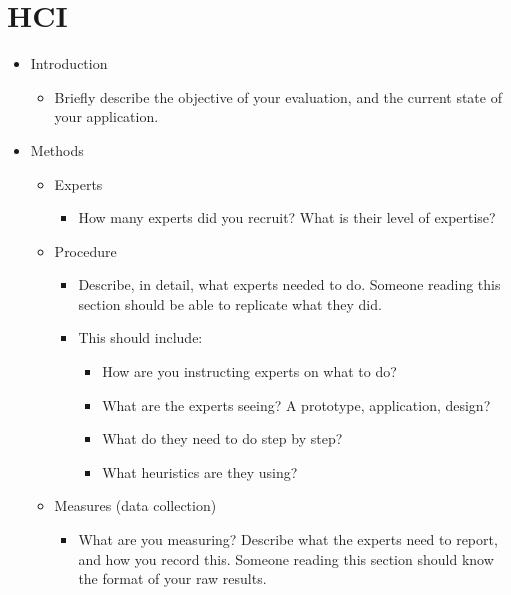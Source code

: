\documentclass{article}
\begin{document}
\section{HCI}
\begin{itemize}
\item Introduction
    \begin{itemize}
        \item Briefly describe the objective of your evaluation, and the current state of your application.
    \end{itemize}
\item Methods
    \begin{itemize}
        \item Experts
        \begin{itemize}
            \item How many experts did you recruit? What is their level of expertise?
        \end{itemize}
    \end{itemize}
    \begin{itemize}
        \item Procedure
        \begin{itemize}
            \item Describe, in detail, what experts needed to do. Someone reading this section should be able to replicate what they did.
            \item This should include:
                \begin{itemize}
                    \item How are you instructing experts on what to do?
                    \item What are the experts seeing? A prototype, application, design?
                    \item What do they need to do step by step?
                    \item What heuristics are they using?
                \end{itemize}
        \end{itemize}
        \item Measures (data collection)
            \begin{itemize}
                \item What are you measuring? Describe what the experts need to report, and how you record this. Someone reading this section should know the format of your raw results.
            \end{itemize}
    \end{itemize}

\end{itemize}
\end{document}
